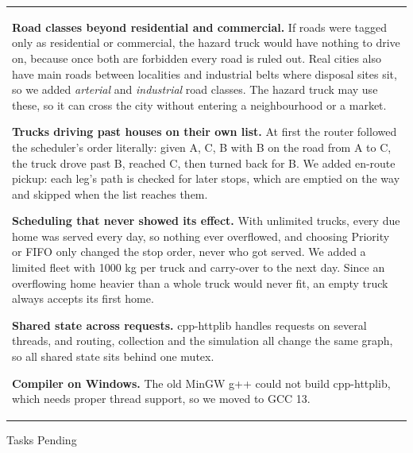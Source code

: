 \documentclass[12pt,a4paper]{article}
\newcommand{\sectiontitle}[1]{%
    {\color{GEUBlue}
    \fontsize{18}{22}\selectfont #1}
}
\newcommand{\answerbox}[2]{%
    \begin{tabularx}{\textwidth}{
        |>{\raggedright\arraybackslash}X|}
        \hline
        \parbox[t][#1][t]{\dimexpr\linewidth-12pt\relax}{
            \vspace{5pt}
            \fontsize{11}{13.5}\selectfont
            \setlength{\parskip}{4pt}
            #2
        }\\
        \hline
    \end{tabularx}
}
\begin{document}
\answerbox{9.8cm}{\textbf{Road classes beyond residential and commercial.} If roads were tagged only as residential or commercial, the hazard truck would have nothing to drive on, because once both are forbidden every road is ruled out. Real cities also have main roads between localities and industrial belts where disposal sites sit, so we added \emph{arterial} and \emph{industrial} road classes. The hazard truck may use these, so it can cross the city without entering a neighbourhood or a market.

\textbf{Trucks driving past houses on their own list.} At first the router followed the scheduler's order literally: given A, C, B with B on the road from A to C, the truck drove past B, reached C, then turned back for B. We added en-route pickup: each leg's path is checked for later stops, which are emptied on the way and skipped when the list reaches them.

\textbf{Scheduling that never showed its effect.} With unlimited trucks, every due home was served every day, so nothing ever overflowed, and choosing Priority or FIFO only changed the stop order, never who got served. We added a limited fleet with 1000 kg per truck and carry-over to the next day. Since an overflowing home heavier than a whole truck would never fit, an empty truck always accepts its first home.

\textbf{Shared state across requests.} cpp-httplib handles requests on several threads, and routing, collection and the simulation all change the same graph, so all shared state sits behind one mutex.

\textbf{Compiler on Windows.} The old MinGW g++ could not build cpp-httplib, which needs proper thread support, so we moved to GCC 13.}

\vspace{0.65cm}

\sectiontitle{Tasks Pending}

\vspace{0.05cm}


\vspace{0.18cm}
\end{document}
